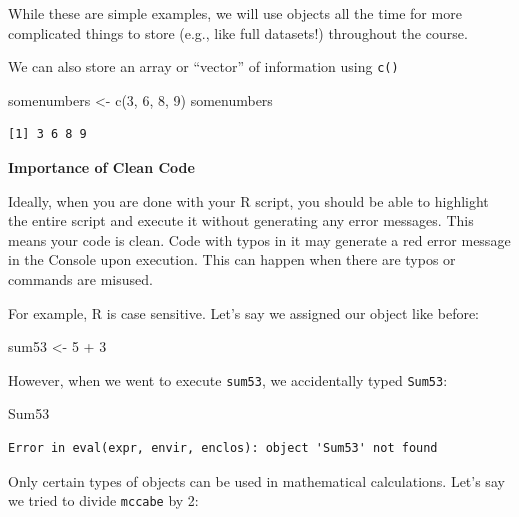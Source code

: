 \documentclass[
  letterpaper,
  DIV=11,
  numbers=noendperiod]{scrreprt}
\newenvironment{Shaded}{\begin{snugshade}}{\end{snugshade}}
\newcommand{\DecValTok}[1]{\textcolor[rgb]{0.68,0.00,0.00}{#1}}
\newcommand{\FunctionTok}[1]{\textcolor[rgb]{0.28,0.35,0.67}{#1}}
\newcommand{\NormalTok}[1]{\textcolor[rgb]{0.00,0.23,0.31}{#1}}
\newcommand{\OtherTok}[1]{\textcolor[rgb]{0.00,0.23,0.31}{#1}}
\newcommand{\SpecialCharTok}[1]{\textcolor[rgb]{0.37,0.37,0.37}{#1}}
\begin{document}
While these are simple examples, we will use objects all the time for
more complicated things to store (e.g., like full datasets!) throughout
the course.

We can also store an array or ``vector'' of information using
\texttt{c()}

\begin{Shaded}
\begin{Highlighting}[]
\NormalTok{somenumbers }\OtherTok{\textless{}{-}} \FunctionTok{c}\NormalTok{(}\DecValTok{3}\NormalTok{, }\DecValTok{6}\NormalTok{, }\DecValTok{8}\NormalTok{, }\DecValTok{9}\NormalTok{)}
\NormalTok{somenumbers}
\end{Highlighting}
\end{Shaded}

\begin{verbatim}
[1] 3 6 8 9
\end{verbatim}

\textbf{Importance of Clean Code}

Ideally, when you are done with your R script, you should be able to
highlight the entire script and execute it without generating any error
messages. This means your code is clean. Code with typos in it may
generate a red error message in the Console upon execution. This can
happen when there are typos or commands are misused.

For example, R is case sensitive. Let's say we assigned our object like
before:

\begin{Shaded}
\begin{Highlighting}[]
\NormalTok{sum53 }\OtherTok{\textless{}{-}} \DecValTok{5} \SpecialCharTok{+} \DecValTok{3}
\end{Highlighting}
\end{Shaded}

However, when we went to execute \texttt{sum53}, we accidentally typed
\texttt{Sum53}:

\begin{Shaded}
\begin{Highlighting}[]
\NormalTok{Sum53}
\end{Highlighting}
\end{Shaded}

\begin{verbatim}
Error in eval(expr, envir, enclos): object 'Sum53' not found
\end{verbatim}

Only certain types of objects can be used in mathematical calculations.
Let's say we tried to divide \texttt{mccabe} by 2:
\end{document}
